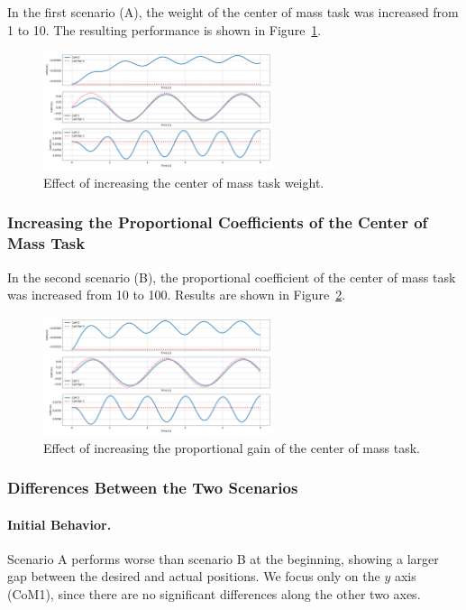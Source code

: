 \documentclass[12pt]{article}
\begin{document}
In the first scenario (A), the weight of the center of mass task was increased from 1 to 10.  
The resulting performance is shown in Figure~\ref{fig:com_weight}.

\begin{figure}[h!]
\centering
\includegraphics[width=0.6\textwidth]{./images/3.2.1.png}
\caption{Effect of increasing the center of mass task weight.}
\label{fig:com_weight}
\end{figure}

\subsubsection{Increasing the Proportional Coefficients of the Center of Mass Task}

In the second scenario (B), the proportional coefficient of the center of mass task was increased from 10 to 100.  
Results are shown in Figure~\ref{fig:com_gain}.

\begin{figure}[h!]
\centering
\includegraphics[width=0.6\textwidth]{./images/3.2.2.png}
\caption{Effect of increasing the proportional gain of the center of mass task.}
\label{fig:com_gain}
\end{figure}

\subsubsection{Differences Between the Two Scenarios}

\paragraph{Initial Behavior.}
Scenario A performs worse than scenario B at the beginning, showing a larger gap between the desired and actual positions.
We focus only on the $y$ axis (CoM1), since there are no significant differences along the other two axes.
\end{document}
